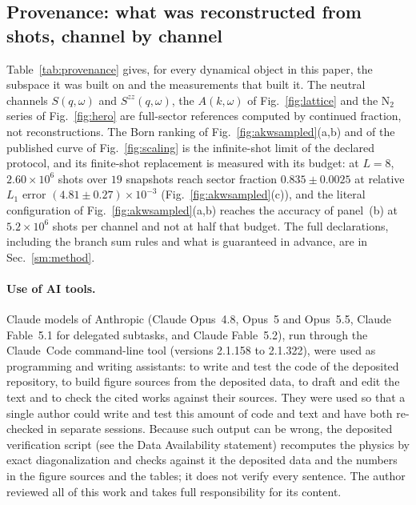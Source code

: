 \subsection{Provenance: what was reconstructed from shots, channel by channel}\label{sec:method:provenance}
Table~\ref{tab:provenance} gives, for every dynamical object in this paper, the subspace it was built on
and the measurements that built it. The neutral channels $S(q,\omega)$ and $S^{zz}(q,\omega)$, the
$A(k,\omega)$ of Fig.~\ref{fig:lattice} and the $\mathrm{N_2}$ series of Fig.~\ref{fig:hero} are
full-sector references computed by continued fraction, not reconstructions. The Born ranking of
Fig.~\ref{fig:akwsampled}(a,b) and of the published curve of Fig.~\ref{fig:scaling} is the infinite-shot
limit of the declared protocol, and its finite-shot replacement is measured with its budget: at $L=8$,
$2.60\times10^{6}$ shots over $19$ snapshots reach sector fraction $0.835\pm0.0025$ at relative $L_1$
error $(4.81\pm0.27)\times10^{-3}$ (Fig.~\ref{fig:akwsampled}(c)), and the literal configuration of
Fig.~\ref{fig:akwsampled}(a,b) reaches the accuracy of panel~(b) at $5.2\times10^{6}$ shots per channel
and not at half that budget. The full declarations, including the branch sum rules and what is guaranteed
in advance, are in Sec.~\ref{sm:method}.

\paragraph{Use of AI tools.} Claude models of Anthropic (Claude Opus~4.8, Opus~5 and Opus~5.5,
Claude Fable~5.1 for delegated subtasks, and Claude Fable~5.2), run through the Claude~Code
command-line tool (versions 2.1.158 to 2.1.322), were used as programming and writing assistants: to
write and test the code of the deposited repository, to build figure sources from the deposited data,
to draft and edit the text and to check the cited works against their sources. They were used so
that a single author could write and test this amount of code and text and have both re-checked in
separate sessions. Because such output can be wrong,
the deposited verification script (see the Data Availability statement) recomputes the physics by
exact diagonalization and checks against it the deposited data and the numbers in the figure
sources and the tables; it does not verify every sentence. The author reviewed all of this work and
takes full responsibility for its content.

